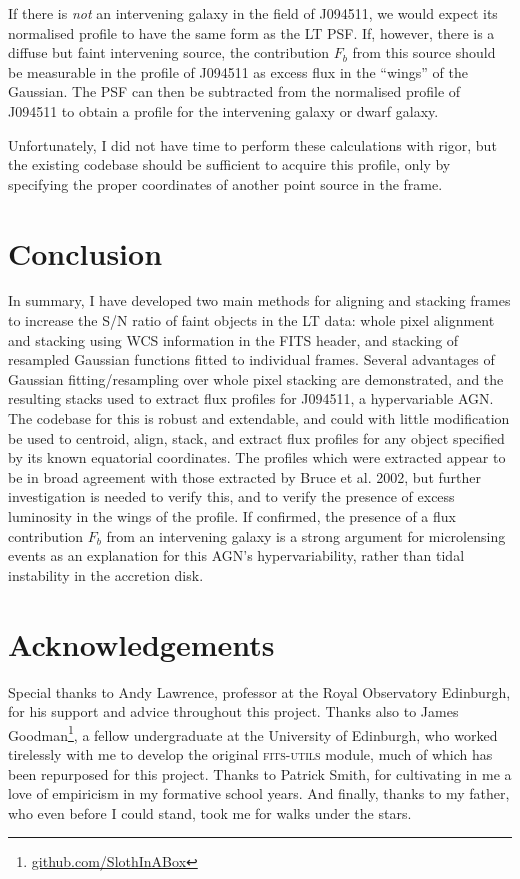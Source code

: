 \documentclass[a4paper,11pt]{article}
\begin{document}
If there is \textit{not} an intervening galaxy in the field of J094511, we would expect its normalised profile to have the same form as the LT PSF. If, however, there is a diffuse but faint intervening source, the contribution $F_b$ from this source should be measurable in the profile of J094511 as excess flux in the ``wings'' of the Gaussian. The PSF can then be subtracted from the normalised profile of J094511 to obtain a profile for the intervening galaxy or dwarf galaxy.

Unfortunately, I did not have time to perform these calculations with rigor, but the existing codebase should be sufficient to acquire this profile, only by specifying the proper coordinates of another point source in the frame.

\section{Conclusion}

In summary, I have developed two main methods for aligning and stacking frames to increase the S/N ratio of faint objects in the LT data: whole pixel alignment and stacking using WCS information in the FITS header, and stacking of resampled Gaussian functions fitted to individual frames. Several advantages of Gaussian fitting/resampling over whole pixel stacking are demonstrated, and the resulting stacks used to extract flux profiles for J094511, a hypervariable AGN. The codebase for this is robust and extendable, and could with little modification be used to centroid, align, stack, and extract flux profiles for any object specified by its known equatorial coordinates. The profiles which were extracted appear to be in broad agreement with those extracted by Bruce et al. 2002, but further investigation is needed to verify this, and to verify the presence of excess luminosity in the wings of the profile. If confirmed, the presence of a flux contribution $F_b$ from an intervening galaxy is a strong argument for microlensing events as an explanation for this AGN's hypervariability, rather than tidal instability in the accretion disk.

\section*{Acknowledgements}

Special thanks to Andy Lawrence, professor at the Royal Observatory Edinburgh, for his support and advice throughout this project. Thanks also to James Goodman\footnote{\url{github.com/SlothInABox}}, a fellow undergraduate at the University of Edinburgh, who worked tirelessly with me to develop the original \textsc{fits-utils} module, much of which has been repurposed for this project. Thanks to Patrick Smith, for cultivating in me a love of empiricism in my formative school years. And finally, thanks to my father, who even before I could stand, took me for walks under the stars.

\printbibliography
\end{document}
